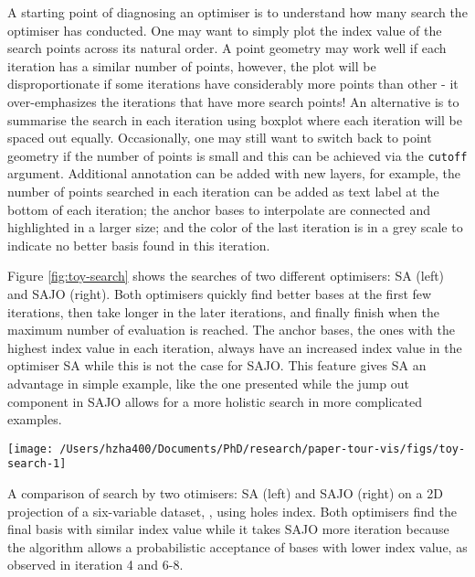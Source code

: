 A starting point of diagnosing an optimiser is to understand how many
search the optimiser has conducted. One may want to simply plot the
index value of the search points across its natural order. A point
geometry may work well if each iteration has a similar number of points,
however, the plot will be disproportionate if some iterations have
considerably more points than other - it over-emphasizes the iterations
that have more search points! An alternative is to summarise the search
in each iteration using boxplot where each iteration will be spaced out
equally. Occasionally, one may still want to switch back to point
geometry if the number of points is small and this can be achieved via
the \texttt{cutoff} argument. Additional annotation can be added with
new layers, for example, the number of points searched in each iteration
can be added as text label at the bottom of each iteration; the anchor
bases to interpolate are connected and highlighted in a larger size; and
the color of the last iteration is in a grey scale to indicate no better
basis found in this iteration.

Figure \ref{fig:toy-search} shows the searches of two different
optimisers: SA (left) and SAJO (right). Both optimisers quickly find
better bases at the first few iterations, then take longer in the later
iterations, and finally finish when the maximum number of evaluation is
reached. The anchor bases, the ones with the highest index value in each
iteration, always have an increased index value in the optimiser SA
while this is not the case for SAJO. This feature gives SA an advantage
in simple example, like the one presented while the jump out component
in SAJO allows for a more holistic search in more complicated examples.

\begin{Schunk}
\begin{widefigure}

{\centering \texttt{[image: /Users/hzha400/Documents/PhD/research/paper-tour-vis/figs/toy-search-1]} 

}

\caption[A comparison of search by two otimisers]{A comparison of search by two otimisers: SA (left) and SAJO (right) on a 2D projection of a six-variable dataset, , using holes index. Both optimisers find the final basis with similar index value while it takes SAJO more iteration because the algorithm allows a probabilistic acceptance of bases with lower index value, as observed in iteration 4 and 6-8.}\label{fig:toy-search}
\end{widefigure}
\end{Schunk}


